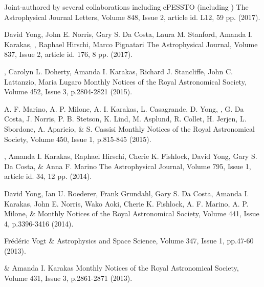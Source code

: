 {Joint-authored by several collaborations including ePESSTO (including )}
{The Astrophysical Journal Letters, Volume 848, Issue 2, article id. L12, 59 pp. (2017).}

{David Yong, John E. Norris, Gary S. Da Costa, Laura M. Stanford, Amanda I. Karakas, , Raphael Hirschi, Marco Pignatari}
{The Astrophysical Journal, Volume 837, Issue 2, article id. 176, 8 pp. (2017).}

{, Carolyn L. Doherty, Amanda I. Karakas, Richard J. Stancliffe, John C. Lattanzio, Maria Lugaro}
{Monthly Notices of the Royal Astronomical Society, Volume 452, Issue 3, p.2804-2821 (2015).}

{A. F. Marino, A. P. Milone, A. I. Karakas, L. Casagrande, D. Yong, , G. Da Costa, J. Norris, P. B. Stetson,  K. Lind, M. Asplund, R. Collet, H. Jerjen, L. Sbordone, A. Aparicio, \& S. Cassisi}
{Monthly Notices of the Royal Astronomical Society, Volume 450, Issue 1, p.815-845 (2015).}

{, Amanda I. Karakas, Raphael Hirschi, Cherie K. Fishlock, David Yong, Gary S. Da Costa, \& Anna F. Marino}
{The Astrophysical Journal, Volume 795, Issue 1, article id. 34, 12 pp. (2014).}

{David Yong, Ian U. Roederer, Frank Grundahl, Gary S. Da Costa, Amanda I. Karakas, John E. Norris, Wako Aoki, Cherie K. Fishlock, A. F. Marino, A. P. Milone, \& }
{Monthly Notices of the Royal Astronomical Society, Volume 441, Issue 4, p.3396-3416 (2014).}

{Fr\'{e}d\'{e}ric Vogt \& }
{Astrophysics and Space Science, Volume 347, Issue 1, pp.47-60 (2013).}

{ \& Amanda I. Karakas}
{Monthly Notices of the Royal Astronomical Society, Volume 431, Issue 3, p.2861-2871 (2013).}

